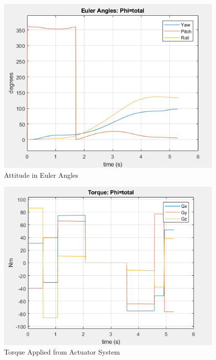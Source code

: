 \documentclass[letterpaper, preprint, paper,11pt]{AAS}	%
\begin{document}
			\begin{figure}[H]
				\label{fig:euler_ang_phi_total}
				\begin{center}
				\includegraphics[width=4.5in]{figures/euler_ang_phi_total.png}
				\end{center}
				\caption{Attitude in Euler Angles}
			\end{figure}
		
			\begin{figure}[H]
				\label{fig:torque_total}
				\begin{center}
				\includegraphics[width=4.5in]{figures/torque_total.png}
				\end{center}
				\caption{Torque Applied from Actuator System}
			\end{figure}
		
			
	
\end{document}
